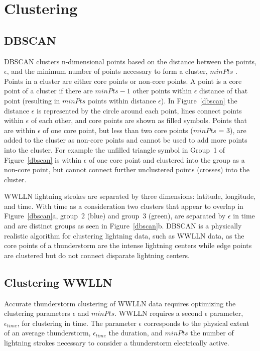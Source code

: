 \section{Clustering}

\subsection{DBSCAN}

DBSCAN clusters n-dimensional points based on the distance between the points, $\epsilon$, and the minimum number of points necessary to form a cluster, $minPts$ \citep{Kriegel2011a}.
Points in a cluster are either core points or non-core points.
A point is a core point of a cluster if there are $minPts - 1$ other points within $\epsilon$ distance of that point (resulting in $minPts$ points within distance $\epsilon$).
In Figure~\ref{dbscan} the distance $\epsilon$ is represented by the circle around each point, lines connect points within $\epsilon$ of each other, and core points are shown as filled symbols.
Points that are within $\epsilon$ of one core point, but less than two core points ($minPts$ = 3), are added to the cluster as non-core points and cannot be used to add more points into the cluster.
For example the unfilled triangle symbol in Group~1 of Figure~\ref{dbscan} is within $\epsilon$ of one core point and clustered into the group as a non-core point, but cannot connect further unclustered points (crosses) into the cluster.

WWLLN lightning strokes are separated by three dimensions: latitude, longitude, and time.
With time as a consideration two clusters that appear to overlap in Figure~\ref{dbscan}a, group~2 (blue) and group~3 (green), are separated by $\epsilon$ in time and are distinct groups as seen in Figure~\ref{dbscan}b.
DBSCAN is a physically realistic algorithm for clustering lightning data, such as WWLLN data, as the core points of a thunderstorm are the intense lightning centers while edge points are clustered but do not connect disparate lightning centers.

\subsection{Clustering WWLLN}

Accurate thunderstorm clustering of WWLLN data requires optimizing the clustering parameters $\epsilon$ and $minPts$.
WWLLN requires a second $\epsilon$ parameter, $\epsilon_{time}$, for clustering in time.
The parameter $\epsilon$ corresponds to the physical extent of an average thunderstorm, $\epsilon_{time}$ the duration, and $minPts$ the number of lightning strokes necessary to consider a thunderstorm electrically active.

